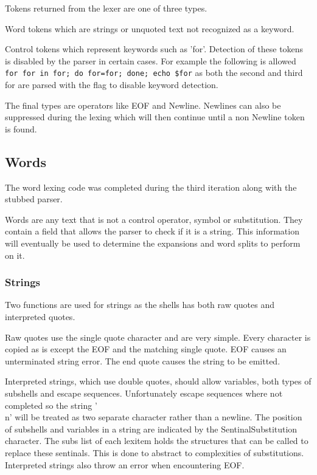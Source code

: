 Tokens returned from the lexer are one of three types.

Word tokens which are strings or unquoted text not recognized as a keyword.

Control tokens which represent keywords such as 'for'.
Detection of these tokens is disabled by the parser in certain cases.
For example the following is allowed \verb!for for in for; do for=for; done; echo $for! as both the second and third for are parsed with the flag to disable keyword detection.

The final types are operators like EOF and Newline. 
Newlines can also be suppressed during the lexing which will then continue until a non Newline token is found. 

\subsection{Words}
The word lexing code was completed during the third iteration along with the stubbed parser.

Words are any text that is not a control operator, symbol or substitution.
They contain a field that allows the parser to check if it is a string.
This information will eventually be used to determine the expansions and word splits to perform on it.

\subsubsection{Strings}
Two functions are used for strings as the shells has both raw quotes and interpreted quotes.

Raw quotes use the single quote character and are very simple.
Every character is copied as is except the EOF and the matching single quote.
EOF causes an unterminated string error.
The end quote causes the string to be emitted.

Interpreted strings, which use double quotes, should allow variables, both types of subshells and escape sequences.
Unfortunately escape sequences where not completed so the string '\\n' will be treated as two separate character rather than a newline.
The position of subshells and variables in a string are indicated by the SentinalSubstitution character.
The subs list of each lexitem holds the structures that can be called to replace these sentinals.
This is done to abstract to complexities of substitutions.
Interpreted strings also throw an error when encountering EOF.

